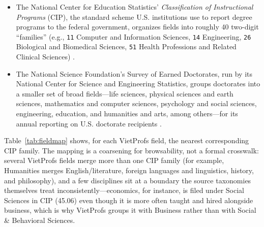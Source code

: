 \documentclass[11pt]{article}
\newcommand{\code}[1]{\texttt{\small #1}}
\begin{document}
\begin{itemize}
\item The National Center for Education Statistics' \emph{Classification of Instructional Programs}
(CIP), the standard scheme U.S. institutions use to report degree programs to the federal government,
organizes fields into roughly 40 two-digit ``families'' (e.g., \code{11} Computer and Information
Sciences, \code{14} Engineering, \code{26} Biological and Biomedical Sciences, \code{51} Health
Professions and Related Clinical Sciences) \cite{nces_cip2020}.
\item The National Science Foundation's Survey of Earned Doctorates, run by its National Center for
Science and Engineering Statistics, groups doctorates into a smaller set of broad fields---life
sciences, physical sciences and earth sciences, mathematics and computer sciences, psychology and
social sciences, engineering, education, and humanities and arts, among others---for its annual
reporting on U.S. doctorate recipients \cite{nsf_sed}.
\end{itemize}

Table~\ref{tab:fieldmap} shows, for each VietProfs field, the nearest corresponding CIP family.
The mapping is a coarsening for browsability, not a formal crosswalk: several VietProfs fields merge more than one CIP family (for example, Humanities merges English/literature, foreign languages and linguistics, history, and philosophy), and a few disciplines sit at a boundary the source taxonomies themselves treat inconsistently---economics, for instance, is filed under Social Sciences in CIP (45.06) even though it is more often taught and hired alongside business, which is why VietProfs groups it with Business rather than with Social \& Behavioral Sciences.
\end{document}
